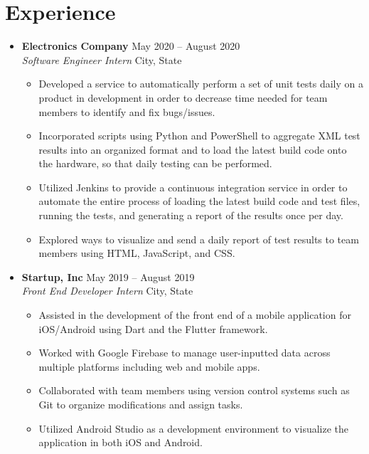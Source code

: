 \documentclass[letterpaper,5pt]{article}
\begin{document}
    \vspace*{-5mm}
    \section{Experience}
    \begin{itemize}[leftmargin=0in, label={}]
        \item[]
            \textbf{Electronics Company} \hfill May 2020 -- August 2020 \\
            \textit{Software Engineer Intern} \hfill  City, State  
            \vspace*{-2mm}
            \begin{itemize}
                \item[\textbullet] Developed a service to automatically perform a set of unit tests daily on a product in development in order to decrease time needed for team members to identify and fix bugs/issues. \vspace*{-1mm}
                \item[\textbullet] Incorporated scripts using Python and PowerShell to aggregate XML test results into an organized format and to load the latest build code onto the hardware, so that daily testing can be performed. \vspace*{-1mm}
                \item[\textbullet] Utilized Jenkins to provide a continuous integration service in order to automate the entire process of loading the latest build code and test files, running the tests, and generating a report of the results once per day. \vspace*{-1mm}
                \item[\textbullet] Explored ways to visualize and send a daily report of test results to team members using HTML, JavaScript, and CSS. \vspace*{-1mm}
            \end{itemize}
        \item[]
            \textbf{Startup, Inc} \hfill May 2019 -- August 2019 \\
            \textit{Front End Developer Intern} \hfill City, State
            \vspace*{-2mm}
            \begin{itemize}
                \item[\textbullet] Assisted in the development of the front end of a mobile application for iOS/Android using Dart and the Flutter framework.
                \item[\textbullet] Worked with Google Firebase to manage user-inputted data across multiple platforms including web and mobile apps.
                \item[\textbullet] Collaborated with team members using version control systems such as Git to organize modifications and assign tasks.
                \item[\textbullet] Utilized Android Studio as a development environment to visualize the application in both iOS and Android.
            \end{itemize}
    \end{itemize}
\end{document}
